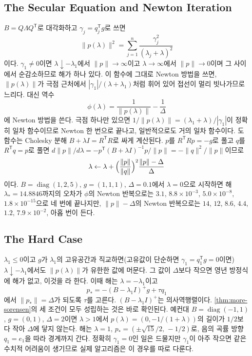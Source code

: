 \subsection{The Secular Equation and Newton Iteration}

$B=Q\Lambda Q^{\mathsf T}$로 대각화하고 $\gamma_j=q_j^{\mathsf T}g$로 쓰면
\[
\|p(\lambda)\|^2=\sum_{j=1}^n\frac{\gamma_j^2}{(\lambda_j+\lambda)^2}
\]
이다. $\gamma_1\ne0$이면 $\lambda\downarrow-\lambda_1$에서 $\|p\|\to\infty$이고 $\lambda\to\infty$에서 $\|p\|\to0$이며 그 사이에서 순감소하므로 해가 하나 있다. 이 함수에 그대로 Newton 방법을 쓰면, $\|p(\lambda)\|$가 극점 근처에서 $|\gamma_1|/(\lambda+\lambda_1)$처럼 휘어 있어 접선이 멀리 빗나가므로 느리다. 대신 역수
\[
\phi(\lambda)=\frac1{\|p(\lambda)\|}-\frac1\Delta
\]
에 Newton 방법을 쓴다. 극점 하나만 있으면 $1/\|p(\lambda)\|=(\lambda_1+\lambda)/|\gamma_1|$이 정확히 일차 함수이므로 Newton 한 번으로 끝나고, 일반적으로도 거의 일차 함수이다. 도함수는 Cholesky 분해 $B+\lambda I=R^{\mathsf T}R$로 싸게 계산된다. $p$를 $R^{\mathsf T}Rp=-g$로 풀고 $q$를 $R^{\mathsf T}q=p$로 풀면 $d\|p\|/d\lambda=-p^{\mathsf T}(B+\lambda I)^{-1}p/\|p\|=-\|q\|^2/\|p\|$이므로
\[
\lambda\gets\lambda+\Bigl(\frac{\|p\|}{\|q\|}\Bigr)^2\frac{\|p\|-\Delta}\Delta
\]
이다. $B=\operatorname{diag}(1,2,5)$, $g=(1,1,1)$, $\Delta=0.1$에서 $\lambda=0$으로 시작하면 해 $\lambda_\ast=14.8846$까지의 오차가 $\phi$의 Newton 반복으로는 $3.1$, $8.8\times10^{-3}$, $5.0\times10^{-8}$, $1.8\times10^{-15}$으로 네 번에 끝나지만, $\|p\|-\Delta$의 Newton 반복으로는 $14$, $12$, $8.6$, $4.4$, $1.2$, $7.9\times10^{-2}$,  아홉 번이 든다.

\subsection{The Hard Case}

$\lambda_1\le0$이고 $g$가 $\lambda_1$의 고유공간과 직교하면(고유값이 단순하면 $\gamma_1=q_1^{\mathsf T}g=0$이면) $\lambda\downarrow-\lambda_1$에서도 $\|p(\lambda)\|$가 유한한 값에 머문다. 그 값이 $\Delta$보다 작으면 영년 방정식에 해가 없고, 이것을 라 한다. 이때 해는 $\lambda=-\lambda_1$이고
\[
p_\ast=-(B-\lambda_1I)^+g+\tau q_1
\]
에서 $\|p_\ast\|=\Delta$가 되도록 $\tau$를 고른다. $(B-\lambda_1I)^+$는 의사역행렬이다. \cref{thm:more-sorensen}의 세 조건이 모두 성립하는 것은 바로 확인된다. 예컨대 $B=\operatorname{diag}(-1,1)$, $g=(0,1)$, $\Delta=2$이면 $\lambda>1$에서 $p(\lambda)=(0,-1/(1+\lambda))$의 길이가 $1/2$보다 작아 $\Delta$에 닿지 않는다. 해는 $\lambda=1$, $p_\ast=(\pm\sqrt{15}/2,\,-1/2)$로, 음의 곡률 방향 $q_1=e_1$을 따라 경계까지 간다. 정확히 $\gamma_1=0$인 일은 드물지만 $\gamma_1$이 아주 작으면 같은 수치적 어려움이 생기므로 실제 알고리즘은 이 경우를 따로 다룬다.

